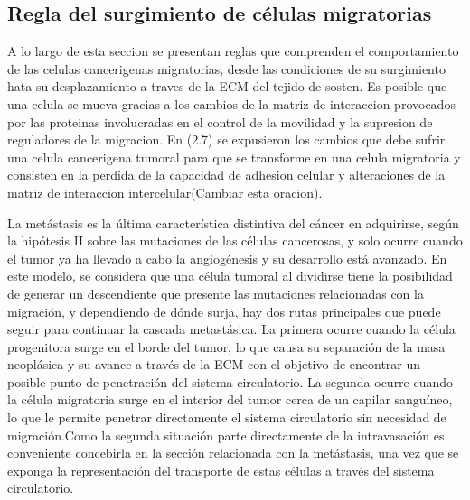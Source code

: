 \subsection{Regla del surgimiento de c\'elulas migratorias}
\label{subsec-migrant}
A lo largo de esta seccion se presentan reglas que comprenden el comportamiento de las celulas cancerigenas migratorias, desde las condiciones de su surgimiento hata su desplazamiento a traves de la ECM del tejido de sosten. Es posible que una celula se mueva gracias a los cambios de la matriz de interaccion provocados por las proteinas involucradas en el control de la movilidad y la supresion de reguladores de la migracion. En (2.7) se expusieron los cambios que debe sufrir una celula cancerigena tumoral para que se transforme en una celula migratoria y consisten en la perdida de la capacidad de adhesion celular y alteraciones de la matriz de interaccion intercelular(Cambiar esta oracion).

La metástasis es la última característica distintiva del cáncer en adquirirse, según la hipótesis II sobre las mutaciones de las células cancerosas, y solo ocurre cuando el tumor ya ha llevado a cabo la angiogénesis y su desarrollo está avanzado. En este modelo, se considera que una célula tumoral al dividirse tiene la posibilidad de generar un descendiente que presente las mutaciones relacionadas con la migración, y dependiendo de dónde surja, hay dos rutas principales que puede seguir para continuar la cascada metastásica. La primera ocurre cuando la célula progenitora surge en el borde del tumor, lo que causa su separación de la masa neoplásica y su avance a través de la ECM con el objetivo de encontrar un posible punto de penetración del sistema circulatorio. La segunda ocurre cuando la célula migratoria surge en el interior del tumor cerca de un capilar sanguíneo, lo que le permite penetrar directamente el sistema circulatorio sin necesidad de migración.Como la segunda situaci\'on parte directamente de la intravasaci\'on es conveniente concebirla en la secci\'on relacionada con la met\'astasis, una vez que se exponga la representaci\'on del transporte de estas c\'elulas a trav\'es del sistema circulatorio.

